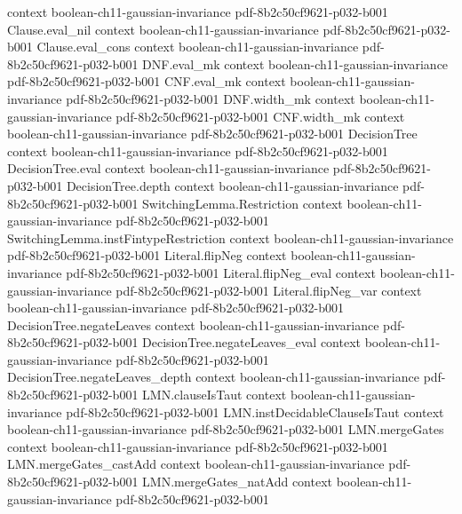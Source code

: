 \begin{theorem}
  {context}
  {boolean-ch11-gaussian-invariance}
  {pdf-8b2c50cf9621-p032-b001}
\proofstep
  {Clause.eval_nil}
  {context}
  {boolean-ch11-gaussian-invariance}
  {pdf-8b2c50cf9621-p032-b001}
\proofstep
  {Clause.eval_cons}
  {context}
  {boolean-ch11-gaussian-invariance}
  {pdf-8b2c50cf9621-p032-b001}
\proofstep
  {DNF.eval_mk}
  {context}
  {boolean-ch11-gaussian-invariance}
  {pdf-8b2c50cf9621-p032-b001}
\proofstep
  {CNF.eval_mk}
  {context}
  {boolean-ch11-gaussian-invariance}
  {pdf-8b2c50cf9621-p032-b001}
\proofstep
  {DNF.width_mk}
  {context}
  {boolean-ch11-gaussian-invariance}
  {pdf-8b2c50cf9621-p032-b001}
\proofstep
  {CNF.width_mk}
  {context}
  {boolean-ch11-gaussian-invariance}
  {pdf-8b2c50cf9621-p032-b001}
\proofstep
  {DecisionTree}
  {context}
  {boolean-ch11-gaussian-invariance}
  {pdf-8b2c50cf9621-p032-b001}
\proofstep
  {DecisionTree.eval}
  {context}
  {boolean-ch11-gaussian-invariance}
  {pdf-8b2c50cf9621-p032-b001}
\proofstep
  {DecisionTree.depth}
  {context}
  {boolean-ch11-gaussian-invariance}
  {pdf-8b2c50cf9621-p032-b001}
\proofstep
  {SwitchingLemma.Restriction}
  {context}
  {boolean-ch11-gaussian-invariance}
  {pdf-8b2c50cf9621-p032-b001}
\proofstep
  {SwitchingLemma.instFintypeRestriction}
  {context}
  {boolean-ch11-gaussian-invariance}
  {pdf-8b2c50cf9621-p032-b001}
\proofstep
  {Literal.flipNeg}
  {context}
  {boolean-ch11-gaussian-invariance}
  {pdf-8b2c50cf9621-p032-b001}
\proofstep
  {Literal.flipNeg_eval}
  {context}
  {boolean-ch11-gaussian-invariance}
  {pdf-8b2c50cf9621-p032-b001}
\proofstep
  {Literal.flipNeg_var}
  {context}
  {boolean-ch11-gaussian-invariance}
  {pdf-8b2c50cf9621-p032-b001}
\proofstep
  {DecisionTree.negateLeaves}
  {context}
  {boolean-ch11-gaussian-invariance}
  {pdf-8b2c50cf9621-p032-b001}
\proofstep
  {DecisionTree.negateLeaves_eval}
  {context}
  {boolean-ch11-gaussian-invariance}
  {pdf-8b2c50cf9621-p032-b001}
\proofstep
  {DecisionTree.negateLeaves_depth}
  {context}
  {boolean-ch11-gaussian-invariance}
  {pdf-8b2c50cf9621-p032-b001}
\proofstep
  {LMN.clauseIsTaut}
  {context}
  {boolean-ch11-gaussian-invariance}
  {pdf-8b2c50cf9621-p032-b001}
\proofstep
  {LMN.instDecidableClauseIsTaut}
  {context}
  {boolean-ch11-gaussian-invariance}
  {pdf-8b2c50cf9621-p032-b001}
\proofstep
  {LMN.mergeGates}
  {context}
  {boolean-ch11-gaussian-invariance}
  {pdf-8b2c50cf9621-p032-b001}
\proofstep
  {LMN.mergeGates_castAdd}
  {context}
  {boolean-ch11-gaussian-invariance}
  {pdf-8b2c50cf9621-p032-b001}
\proofstep
  {LMN.mergeGates_natAdd}
  {context}
  {boolean-ch11-gaussian-invariance}
  {pdf-8b2c50cf9621-p032-b001}

\end{theorem}
